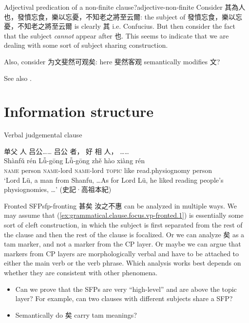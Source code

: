 \documentclass[UTF8, a4paper, oneside, scheme=plain, 12pt]{ctexrep}
\newcommand{\translate}[1]{`#1'}
\newcommand*{\category}[1]{\textsc{#1}}
\begin{document}
\begin{todobox}{Adjectival predication of a non-finite clause?}{adjective-non-finite}
    Consider 其為人也，發憤忘食，樂以忘憂，不知老之將至云爾:
    the subject of 發憤忘食，樂以忘憂，不知老之將至云爾 is clearly 其 i.e. Confucius.
    But then consider the fact that the subject \emph{cannot} appear after 也.
    This seems to indicate that we are dealing with some sort of subject sharing construction.

    Also, consider 为文斐然可观矣: here 斐然客观 semantically modifies 文?

    See also .
\end{todobox}



\chapter{Information structure}

Verbal judgemental clause

\begin{exe}
    \ex\label{ex:grammatical.clause.topic.2}
    \glll 单父 人 吕公…… 吕公 者， 好 相 人， …… \\
    Shànfǔ rén Lǚ-gōng Lǚ-gōng zhě hào xiàng rén {} \\
    \category{name} person \category{name}-lord \category{name}-lord \category{topic} like read.physiognomy person {} \\
    \glt\translate{Lord Lü, a man from Shanfu, \dots As for Lord Lü, he liked reading people's physiognomies, \dots} \hfill (史記·高祖本紀)
\end{exe}

\begin{todobox}{Fronted SFP}{sfp-fronting}
    甚矣 汝之不惠 can be analyzed in multiple ways.
    We may assume that (\ref{ex:grammatical.clause.focus.vp-fronted.1}) is essentially some sort of cleft construction,
    in which the subject is first separated from the rest of the clause
    and then the rest of the clause is focalized.
    Or we can analyze 矣 as a \ac{tam} marker, and not a marker from the CP layer.
    Or maybe we can argue that markers from CP layers are morphologically verbal
    and have to be attached to either the main verb or the verb phrase.
    Which analysis works best depends on whether they are consistent with other phenomena.
    \begin{itemize}
        \item Can we prove that the SFPs are very ``high-level'' and are above the topic layer? For example, can two clauses with different subjects share a SFP?
        \item Semantically do 矣 carry \ac{tam} meanings?
    \end{itemize}
\end{todobox}
\end{document}
